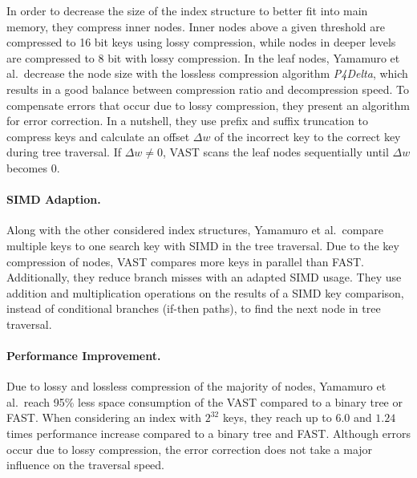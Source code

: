 \documentclass[runningheads,a4paper]{llncs}
\begin{document}
In order to decrease the size of the index structure to better fit into main memory, they compress inner nodes. Inner nodes above a given threshold are compressed to 16 bit keys using lossy compression, while nodes in deeper levels are compressed to 8 bit with lossy compression. In the leaf nodes, Yamamuro et al.\ decrease the node size with the lossless compression algorithm \emph{P4Delta}, which results in a good balance between compression ratio and decompression speed. To compensate errors that occur due to lossy compression, they present an algorithm for error correction. In a nutshell, they use prefix and suffix truncation to compress keys and calculate an offset $\Delta w$ of the incorrect key to the correct key during tree traversal. If $\Delta w\neq0$, VAST scans the leaf nodes sequentially until $\Delta w$ becomes $0$.


\paragraph{SIMD Adaption.}
Along with the other considered index structures, Yamamuro et al.\ compare multiple keys to one search key with SIMD in the tree traversal. Due to the key compression of nodes, VAST compares more keys in parallel than FAST. Additionally, they reduce branch misses with an adapted SIMD usage. They use addition and multiplication operations on the results of a SIMD key comparison, instead of conditional branches (if-then paths), to find the next node in tree traversal.


\paragraph{Performance Improvement.}
Due to lossy and lossless compression of the majority of nodes, Yamamuro et al.\ reach 95\% less space consumption of the VAST compared to a binary tree or FAST. When considering an index with $2^{32}$ keys, they reach up to $6.0$ and $1.24$ times performance increase compared to a binary tree and FAST. Although errors occur due to lossy compression, the error correction does not take a major influence on the traversal speed.

\end{document}
